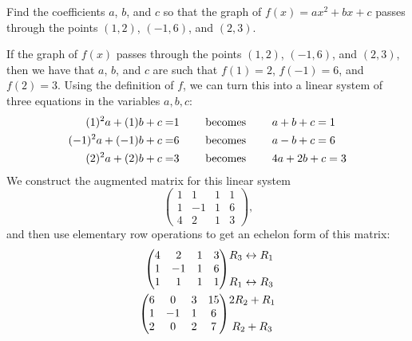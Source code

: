\documentclass[12pt]{article}
\newenvironment{problem}[2][Problem]
{
	\begin{trivlist} 
		\item[\hskip \labelsep {\bfseries #1 #2:}]
	}
{
	\end{trivlist}
	}
\newenvironment{solution}[1][Solution]
{
	\begin{trivlist} 
		\item[\hskip \labelsep {\itshape #1:}]
	}
	{
	\end{trivlist}
}
\begin{document}
\newpage
\begin{problem}{2}
Find the coefficients $a$, $b$, and $c$ so that the graph of $f(x) = a x^2 +bx +c$ passes through the points $(1,2)$, $(-1,6)$, and $(2,3)$.
\noindent
\newline
\newline
\begin{solution}
If the graph of $f(x)$ passes through the points $(1,2)$, $(-1,6)$, and $(2,3)$, then we have that $a$, $b$, and $c$ are such that $f(1)=2$, $f(-1) = 6$, and $f(2)=3$. Using the definition of $f$, we can turn this into a linear system of three equations in the variables $a,b,c$:
\begin{align*}
(1)^2 a+(1)b+c=&1 \hphantom{1000} \text{ becomes } \hphantom{1000} a+b+c=1\\
(-1)^2 a + (-1) b+ c=&6 \hphantom{1000} \text{ becomes } \hphantom{1000} a-b+c=6\\
(2)^2 a+(2) b+c=&3 \hphantom{1000} \text{ becomes }  \hphantom{1000} 4a+2b+c=3
\end{align*}
We construct the augmented matrix for this linear system
\[
\begin{pmatrix} 1&1&1&1\\1&-1&1&6\\4&2&1&3 \end{pmatrix} \text{,}
\] 
and then use elementary row operations to get an echelon form of this matrix:
\begin{align*}
\begin{pmatrix}4&2&1&3\\1&-1&1&6\\1&1&1&1 \end{pmatrix} 
&\begin{matrix}
R_3 \leftrightarrow R_1 
\\
\hphantom{1}
\\
R_1 \leftrightarrow R_3
\end{matrix} \\
%
%
%
\begin{pmatrix}6&0&3&15\\1&-1&1&6\\2&0&2&7 \end{pmatrix} 
&\begin{matrix}
2R_2 + R_1 
\\
\hphantom{1}
\\
R_2 + R_3
\end{matrix} \\

\end{align*}
\end{solution}
\end{problem}
\end{document}
